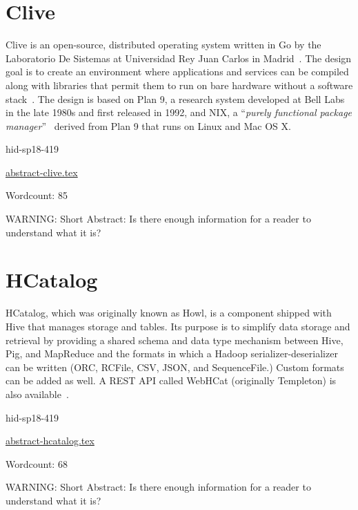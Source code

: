 \section{Clive}

Clive is an open-source, distributed operating system written in Go by
the Laboratorio De Sistemas at Universidad Rey Juan Carlos in
Madrid~\cite{hid-sp18-419-www-clive-lsub}. The design goal is to create
an environment where applications and services can be compiled along
with libraries that permit them to run on bare hardware without a
software stack~\cite{hid-sp18-419-www-clive-lsub2014}. The design is
based on Plan 9, a research system developed at Bell
Labs in the late 1980s and first released in
1992\cite{hid-sp18-419-www-about-plan9}, and NIX, a
\color{blue}``\emph{purely functional package manager}''\color{black}~\cite{hid-sp18-419-www-about-nix}
derived from Plan 9 that runs on Linux and Mac OS X.


\begin{IU}

hid-sp18-419

\href{https://github.com/cloudmesh-community/hid-sp18-419/blob/master//technology/abstract-clive.tex}{abstract-clive.tex}

 

Wordcount: 85

WARNING: Short Abstract: Is there enough information for a reader to understand what it is?

\end{IU}

\section{HCatalog}

HCatalog, which was originally known as Howl, is a component shipped
with Hive that manages storage and tables. Its purpose is to simplify
data storage and retrieval by providing a shared schema and data type
mechanism between Hive, Pig, and MapReduce and the formats
in which a Hadoop serializer-deserializer can be written (ORC,
RCFile, CSV, JSON, and SequenceFile.) Custom formats can be added as
well. A REST API called WebHCat (originally Templeton) is also
available~\cite{hid-sp18-419-www-hc-wiki}.


\begin{IU}

hid-sp18-419

\href{https://github.com/cloudmesh-community/hid-sp18-419/blob/master//technology/abstract-hcatalog.tex}{abstract-hcatalog.tex}

 

Wordcount: 68

WARNING: Short Abstract: Is there enough information for a reader to understand what it is?

\end{IU}

